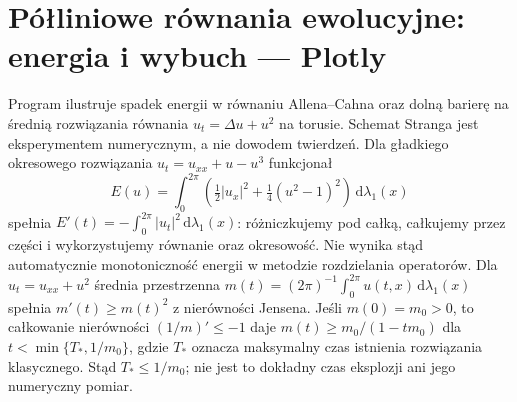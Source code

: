 \section{Półliniowe równania ewolucyjne: energia i wybuch — Plotly}
\label{sec:pde25-code}
Program ilustruje spadek energii w równaniu Allena--Cahna
oraz dolną barierę na średnią rozwiązania równania
$u_t=\Delta u+u^2$ na torusie. Schemat Stranga jest
eksperymentem numerycznym, a nie dowodem twierdzeń.
Dla gładkiego okresowego rozwiązania
$u_t=u_{xx}+u-u^3$ funkcjonał
\[
 E(u)=\int_0^{2\pi}
 \left(\tfrac12|u_x|^2+\tfrac14(u^2-1)^2\right)
 \,\mathrm d\lambda_1(x)
\]
spełnia $E'(t)=-\int_0^{2\pi}|u_t|^2\,\mathrm d\lambda_1(x)$:
różniczkujemy pod całką, całkujemy przez części
i wykorzystujemy równanie oraz okresowość.
Nie wynika stąd automatycznie monotoniczność energii
w metodzie rozdzielania operatorów.
Dla $u_t=u_{xx}+u^2$ średnia przestrzenna
$m(t)=(2\pi)^{-1}\int_0^{2\pi}u(t,x)\,\mathrm d\lambda_1(x)$
spełnia $m'(t)\ge m(t)^2$ z nierówności Jensena.
Jeśli $m(0)=m_0>0$, to całkowanie nierówności
$(1/m)'\le-1$ daje $m(t)\ge m_0/(1-tm_0)$
dla $t<\min\{T_*,1/m_0\}$, gdzie $T_*$ oznacza
maksymalny czas istnienia rozwiązania klasycznego.
Stąd $T_*\le1/m_0$; nie jest to dokładny czas
eksplozji ani jego numeryczny pomiar.
